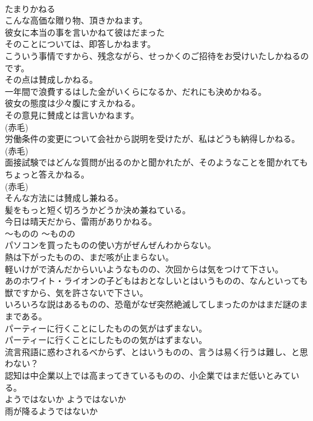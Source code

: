 \documentclass[8pt]{extreport}
\begin{document}
\begin{CJK}{UTF8}{min}
\\	たまりかねる  
\\	こんな高価な贈り物、頂きかねます。  
\\	彼女に本当の事を言いかねて彼はだまった  
\\	そのことについては、即答しかねます。 
\\	こういう事情ですから、残念ながら、せっかくのご招待をお受けいたしかねるのです。   
\\	その点は賛成しかねる。   
\\	一年間で浪費するはした金がいくらになるか、だれにも決めかねる。   
\\	彼女の態度は少々腹にすえかねる。   
\\	その意見に賛成とは言いかねます。  
\\	(赤毛)
\\	労働条件の変更について会社から説明を受けたが、私はどうも納得しかねる。  
\\	(赤毛)
\\	面接試験ではどんな質問が出るのかと聞かれたが、そのようなことを聞かれてもちょっと答えかねる。  
\\	(赤毛)
\\	そんな方法には賛成し兼ねる。  
\\	髪をもっと短く切ろうかどうか決め兼ねている。  
\\	今日は晴天だから、雷雨がありかねる。  
\\	〜ものの	〜ものの	
\\	パソコンを買ったものの使い方がぜんぜんわからない。  
\\	熱は下がったものの、まだ咳が止まらない。  
\\	軽いけがで済んだからいいようなものの、次回からは気をつけて下さい。  
\\	あのホワイト・ライオンの子どもはおとなしいとはいうものの、なんといっても獣ですから、気を許さないで下さい。  
\\	いろいろな説はあるものの、恐竜がなぜ突然絶滅してしまったのかはまだ謎のままである。  
\\	パーティーに行くことにしたものの気がはずまない。  
\\	パーティーに行くことにしたものの気がはずまない。   
\\	流言飛語に惑わされるべからず、とはいうものの、言うは易く行うは難し、と思わない？   
\\	認知は中企業以上では高まってきているものの、小企業ではまだ低いとみている。   
\\	ようではないか	ようではないか	
\\	雨が降るようではないか  

\end{CJK}
\end{document}
